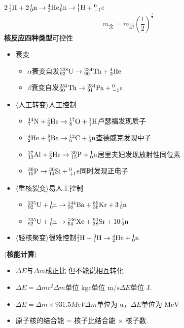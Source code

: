 \noindent $2\,{}^{1}_{1}\mathrm{H}+2\,{}^{1}_{0}\mathrm{n}\to{}^{4}_{2}\mathrm{He}$\qquad ${}^{1}_{0}\mathrm{n}\to{}^{1}_{1}\mathrm{H}+{}^{0}_{-1}\mathrm{e}$ %
\[
m_{\text{余}}=m_{\text{原}}\left(\frac12\right)^{\frac{t}{\tau}}
\] %
\textbf{核反应四种类型}\quad 可控性 %
\begin{itemize}
\item 衰变
  \begin{itemize}
  \item $\alpha$衰变\quad 自发\quad ${}^{238}_{92}\mathrm{U}\to{}^{234}_{90}\mathrm{Th}+{}^{4}_{2}\mathrm{He}$
  \item $\beta$衰变\quad 自发\quad ${}^{234}_{90}\mathrm{Th}\to{}^{234}_{91}\mathrm{Pa}+{}^{0}_{-1}\mathrm{e}$
  \end{itemize}
\item $\langle$人工转变$\rangle$\quad 人工控制
  \begin{itemize}
  \item ${}^{14}_{7}\mathrm{N}+{}^{4}_{2}\mathrm{He}\to{}^{17}_{8}\mathrm{O}+{}^{1}_{1}\mathrm{H}$\quad 卢瑟福发现质子
  \item ${}^{4}_{2}\mathrm{He}+{}^{9}_{4}\mathrm{Be}\to{}^{12}_{6}\mathrm{C}+{}^{1}_{0}\mathrm{n}$\quad 查德威克发现中子
  \item ${}^{27}_{13}\mathrm{Al}+{}^{4}_{2}\mathrm{He}\to{}^{30}_{15}\mathrm{P}+{}^{1}_{0}\mathrm{n}$\quad 居里夫妇发现放射性同位素
  \item ${}^{30}_{15}\mathrm{P}\to{}^{30}_{14}\mathrm{Si}+{}^{0}_{+1}\mathrm{e}$\quad 同时发现正电子
  \end{itemize}
\item $\langle$重核裂变$\rangle$\quad 易人工控制
  \begin{itemize}
  \item ${}^{235}_{92}\mathrm{U}+{}^{1}_{0}\mathrm{n}\to{}^{144}_{56}\mathrm{Ba}+{}^{89}_{36}\mathrm{Kr}+3\,{}^{1}_{0}\mathrm{n}$
  \item ${}^{235}_{92}\mathrm{U}+{}^{1}_{0}\mathrm{n}\to{}^{136}_{54}\mathrm{Xe}+{}^{90}_{38}\mathrm{Sr}+10\,{}^{1}_{0}\mathrm{n}$
  \end{itemize}
\item $\langle$轻核聚变$\rangle$\quad 很难控制\quad ${}^{2}_{1}\mathrm{H}+{}^{3}_{1}\mathrm{H}\to{}^{4}_{2}\mathrm{He}+{}^{1}_{0}\mathrm{n}$
\end{itemize}
\textbf{$\langle$核能计算$\rangle$} %
\begin{itemize}
\item[$\downarrow$] $\Delta E$与$\Delta m$成正比 但不能说相互转化
\item[] $\Delta E=\Delta mc^2$\quad $\Delta m$单位 $\mathrm{kg}$\quad $c$单位 $\mathrm{m/s}$\quad $\Delta E$单位 $\mathrm{J}$.
\item[] $\Delta E=\Delta m\times931.5\unit{MeV}$\quad $\Delta m$单位为 $\mathrm{u}$，$\Delta E$单位为 $\mathrm{MeV}$
\item[] 原子核的结合能 = 核子比结合能 $\times$ 核子数.
\end{itemize}
